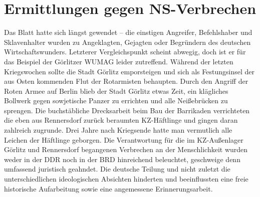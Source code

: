 \chapter{Ermittlungen gegen NS-Verbrechen}

Das Blatt hatte sich längst gewendet -- die einstigen Angreifer, Befehlshaber und Sklavenhalter wurden zu Angeklagten, Gejagten oder Begründern des deutschen Wirtschaftswunders. Letzt\-er\-er Vergleichspunkt scheint abwegig, doch ist er für das Beispiel der Görlitzer WUMAG leider zutreffend.
Während der letzten Kriegswochen sollte die Stadt Görlitz emporsteigen und sich als Festungsinsel der aus Osten kommenden Flut der Rotarmisten behaupten. Durch den Angriff der Roten Armee auf Berlin blieb der Stadt Görlitz etwas Zeit, ein klägliches Bollwerk gegen sowjetische Panzer zu errichten und alle Neißebrücken zu sprengen. Die buchstäbliche Drecksarbeit beim Bau der Barrikaden verrichteten die eben aus Rennersdorf zurück beraumten KZ-Häftlinge und gingen daran zahlreich zugrunde.
Drei Jahre nach Kriegsende hatte man vermutlich alle Leichen der Häftlinge geborgen. Die Verantwortung für die im KZ-Außenlager Görlitz und Rennersdorf begangenen Verbrechen an der Menschlichkeit wurden weder in der DDR noch in der BRD hinreichend beleuchtet, geschweige denn umfassend juristisch geahndet. Die deutsche Teilung und nicht zuletzt die unterschiedlichen ideologischen Absichten hinderten und beeinflussten eine freie historische Aufarbeitung sowie eine angemessene Erinnerungsarbeit.





